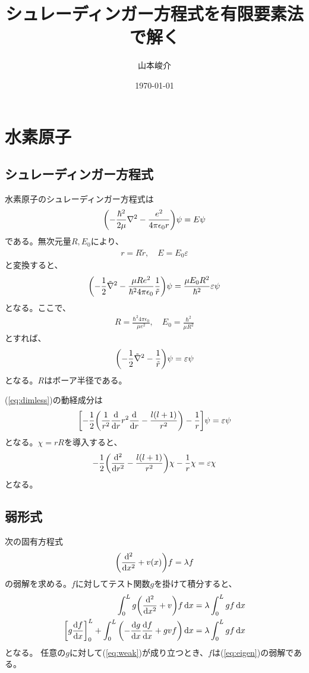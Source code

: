 \documentclass[xelatex,ja=standard]{bxjsarticle}
\title{シュレーディンガー方程式を有限要素法で解く}
\author{山本峻介}
\date{\today}
\begin{document}
\maketitle

\section{水素原子}
\subsection{シュレーディンガー方程式}
水素原子のシュレーディンガー方程式は
\begin{align}
    \qty(-\frac{\hbar^2}{2\mu}\nabla^2 -\frac{e^2}{4\pi\epsilon_0 r})\psi = E\psi
\end{align}
である。無次元量$R, E_0$により、
\begin{align}
    r = R\tilde{r},\quad E = E_0\varepsilon
\end{align}
と変換すると、
\begin{align}
    \qty(-\frac{1}{2}\tilde\nabla^2 - \frac{\mu R e^2}{\hbar^2 4\pi\epsilon_0}\frac{1}{\tilde r})\psi = \frac{\mu E_0R^2}{\hbar^2}\varepsilon\psi
\end{align}
となる。ここで、
\begin{align}
    R = \frac{\hbar^2 4\pi\epsilon_0}{\mu e^2}, \quad E_0 = \frac{\hbar^2}{\mu R^2}
\end{align}
とすれば、
\begin{align}
    \qty(-\frac{1}{2}\tilde\nabla^2 - \frac{1}{\tilde r})\psi = \varepsilon\psi\label{eq:dimless}
\end{align}
となる。$R$はボーア半径である。

(\ref{eq:dimless})の動経成分は
\begin{align}
    \qty[-\frac{1}{2}\qty(\frac{1}{r^2}\dv{r}r^2\dv{r} - \frac{l(l+1)}{r^2})
     - \frac{1}{r}]\psi = \varepsilon\psi
\end{align}
となる。$\chi = rR$を導入すると、
\begin{align}
    -\frac{1}{2}\qty(\dv[2]{r} - \frac{l(l+1)}{r^2})\chi - \frac{1}{r}\chi = \varepsilon\chi
\end{align}
となる。 

\subsection{弱形式}
次の固有方程式
\begin{align}
    \qty(\dv[2]{x} + v(x))f = \lambda f\label{eq:eigen}
\end{align}
の弱解を求める。$f$に対してテスト関数$g$を掛けて積分すると、
\begin{align}
    \int_0^Lg\qty(\dv[2]{x} + v)f\dd{x} &= \lambda\int_0^Lgf\dd{x}\notag\\
    \qty[g\dv{f}{x}]_0^L+\int_0^L\qty(-\dv{g}{x}\dv{f}{x} + gvf)\dd{x}
     &= \lambda\int_0^Lgf\dd{x}\label{eq:weak}
\end{align}
となる。  任意の$g$に対して(\ref{eq:weak})が成り立つとき、$f$は(\ref{eq:eigen})の弱解である。
\end{document}
